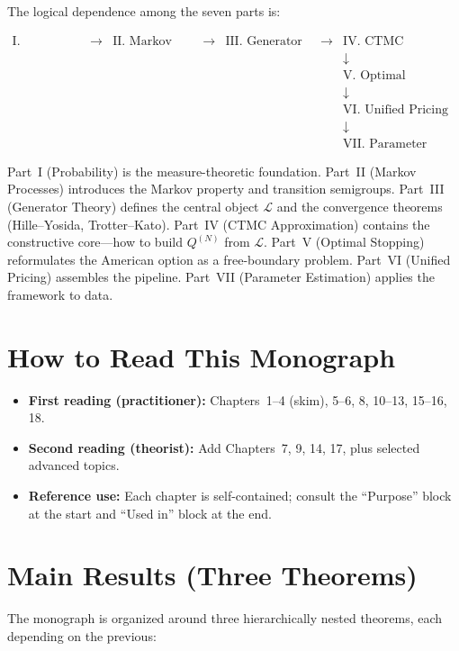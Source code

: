 \documentclass[11pt,a4paper,openany]{book}
\theoremstyle{definition}
\theoremstyle{plain}
\theoremstyle{remark}
\newcommand{\1}{\mathbbm{1}}
\begin{document}
The logical dependence among the seven parts is:

\[
\begin{array}{ccccccc}
\text{I. Probability} & \longrightarrow & \text{II. Markov Processes} & \longrightarrow & \text{III. Generator Theory} & \longrightarrow & \text{IV. CTMC Approximation} \\
&&&&&& \downarrow \\
&&&&&& \text{V. Optimal Stopping} \\
&&&&&& \downarrow \\
&&&&&& \text{VI. Unified Pricing} \\
&&&&&& \downarrow \\
&&&&&& \text{VII. Parameter Estimation}
\end{array}
\]

\noindent Part~I (Probability) is the measure-theoretic foundation. Part~II (Markov Processes) introduces the Markov property and transition semigroups. Part~III (Generator Theory) defines the central object $\mathcal{L}$ and the convergence theorems (Hille--Yosida, Trotter--Kato). Part~IV (CTMC Approximation) contains the constructive core---how to build $Q^{(N)}$ from $\mathcal{L}$. Part~V (Optimal Stopping) reformulates the American option as a free-boundary problem. Part~VI (Unified Pricing) assembles the pipeline. Part~VII (Parameter Estimation) applies the framework to data.

\section{How to Read This Monograph}

\begin{itemize}
    \item \textbf{First reading (practitioner):} Chapters~1--4 (skim), 5--6, 8, 10--13, 15--16, 18.
    \item \textbf{Second reading (theorist):} Add Chapters~7, 9, 14, 17, plus selected advanced topics.
    \item \textbf{Reference use:} Each chapter is self-contained; consult the ``Purpose'' block at the start and ``Used in'' block at the end.
\end{itemize}

\section{Main Results (Three Theorems)}

The monograph is organized around three hierarchically nested theorems, each depending on the previous:
\end{document}
